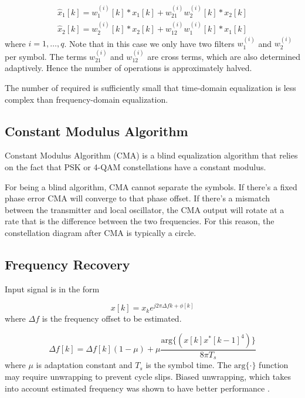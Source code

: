 \documentclass[a4paper]{article}
\begin{document}
\begin{align}
\hat{x}_{1}[k] = w^{(i)}_{1}[k]\ast x_1[k] + w_{21}^{(i)}w^{(i)}_{2}[k]\ast x_2[k] \\
\hat{x}_{2}[k] = w^{(i)}_{2}[k]\ast x_2[k] + w_{12}^{(i)}w^{(i)}_{1}[k]\ast x_1[k]
\end{align}
where $i = 1, \ldots, q$. Note that in this case we only have two filters $w^{(i)}_{1}$ and $w^{(i)}_{2}$ per symbol. The terms $w_{21}^{(i)}$ and $w_{12}^{(i)}$ are cross terms, which are also determined adaptively. Hence the number of operations is approximately halved.

The number of required is sufficiently small that time-domain equalization is less complex than frequency-domain equalization.

\subsection{Constant Modulus Algorithm}

Constant Modulus Algorithm (CMA) is a blind equalization algorithm that relies on the fact that PSK or 4-QAM constellations have a constant modulus. 

For being a blind algorithm, CMA cannot separate the symbols. If there's a fixed phase error CMA will converge to that phase offset. If there's a mismatch between the transmitter and local oscillator, the CMA output will rotate at a rate that is the difference between the two frequencies. For this reason, the constellation diagram after CMA is typically a circle. 


\subsection{Frequency Recovery}
\cite{Hoffmann2008} 

Input signal is in the form

\begin{equation}
x[k] = x_ke^{j2\pi\Delta fk + \phi[k]}
\end{equation}
where $\Delta f$ is the frequency offset to be estimated.

\begin{equation}
\Delta f[k] = \Delta f[k](1-\mu) + \mu\frac{\mathrm{arg}\{(x[k]x^*[k-1]^4)\}}{8\pi T_s}
\end{equation}
where $\mu$ is adaptation constant and $T_s$ is the symbol time. The $\mathrm{arg}\{\cdot\}$ function may require unwrapping to prevent cycle slips. Biased unwrapping, which takes into account estimated frequency was shown to have better performance \cite{Hoffmann2008}.
\end{document}
